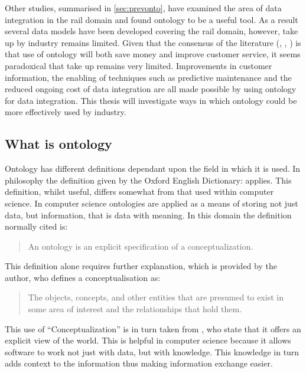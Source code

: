 Other studies, summarised in \autoref{sec:prevonto}, have examined the area of data integration in the rail domain and found ontology to be a useful tool. As a result several data models have been developed covering the rail domain, however, take up by industry remains limited. Given that the consensus of the literature (\citep{Kopf2010}, \citep{Gogos2016}, \citep{Verstichel2015} ) is that use of ontology will both save money and improve customer service, it seems paradoxical that take up remains very limited.  Improvements in customer information, the enabling of techniques such as predictive maintenance and the reduced ongoing cost of data integration are all made possible by using ontology for data integration. This thesis will investigate ways in which ontology could be more effectively used by industry.

\subsection{What is ontology}

Ontology has different definitions dependant upon the field in which it is used. In philosophy the definition given by the Oxford English Dictionary:  applies. This definition, whilst useful, differs somewhat from that used within computer science. In computer science ontologies are applied as a means of storing not just data, but information, that is data with meaning. In this domain the definition normally cited is:

\begin{quote}
An ontology is an explicit specification of a conceptualization. 
\end{quote}
\citet{gruber1993translation} 

 This definition alone requires further explanation, which is provided by the author, who defines a conceptualisation as: 
\begin{quote}
	The objects, concepts, and other entities that are presumed to exist in some area of interest and the relationships that hold them.
\end{quote}

 This use of ``Conceptualization'' is in turn taken from \citet{Genesereth1987}, who state that it offers an explicit view of the world. This is helpful in computer science because it allows software to work not just with data, but with knowledge. This knowledge in turn adds context to the information thus making information exchange easier.


